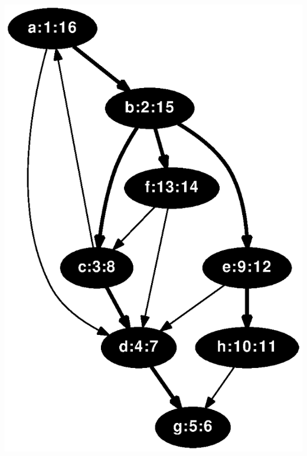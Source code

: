 \documentclass{article}
\begin{document}
\includegraphics[height=.3\textheight]{dfs_directed_classroom_16.eps}
\vspace{1em}
\end{document}
